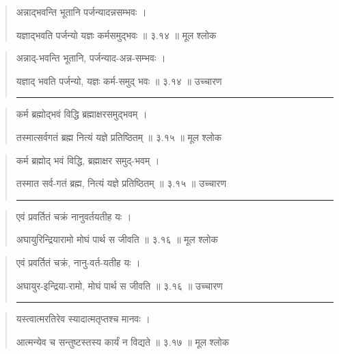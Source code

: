 \begin{quotation}

अन्नाद्भवन्ति भूतानि पर्जन्यादन्नसम्भवः  ।  

यज्ञाद्भवति पर्जन्यो यज्ञः कर्मसमुद्भवः  ॥ ३.१४ ॥  मूल श्लोक
\end{quotation}

\begin{quotation}

अन्नाद्-भवन्ति भूतानि, पर्जन्याद-अन्न-सम्भवः  ।  

यज्ञाद् भवति पर्जन्यो, यज्ञः कर्म-समुद् भवः  ॥ ३.१४ ॥  उच्चारण

\noindent\rule{16cm}{0.4pt} 
\end{quotation}


\begin{quotation}

कर्म ब्रह्मोद्भवं विद्धि ब्रह्माक्षरसमुद्भवम्‌  ।  

तस्मात्सर्वगतं ब्रह्म नित्यं यज्ञे प्रतिष्ठितम्‌  ॥ ३.१५ ॥  मूल श्लोक
\end{quotation}

\begin{quotation}

कर्म ब्रह्मोद् भवं विद्धि, ब्रह्माक्षर समुद्-भवम्‌  ।  

तस्मात सर्व-गतं ब्रह्म, नित्यं यज्ञे प्रतिष्ठितम्‌  ॥ ३.१५ ॥  उच्चारण

\noindent\rule{16cm}{0.4pt} 
\end{quotation}


\begin{quotation}

एवं प्रवर्तितं चक्रं नानुवर्तयतीह यः  ।  

अघायुरिन्द्रियारामो मोघं पार्थ स जीवति  ॥ ३.१६ ॥  मूल श्लोक
\end{quotation}

\begin{quotation}

एवं प्रवर्तितं चक्रं, नानु-वर्त-यतीह यः  ।  

अघायुर-इन्द्रिया-रामो, मोघं पार्थ स जीवति  ॥ ३.१६ ॥  उच्चारण

\noindent\rule{16cm}{0.4pt} 
\end{quotation}


\begin{quotation}

यस्त्वात्मरतिरेव स्यादात्मतृप्तश्च मानवः  ।  

आत्मन्येव च सन्तुष्टस्तस्य कार्यं न विद्यते  ॥ ३.१७ ॥  मूल श्लोक
\end{quotation}

